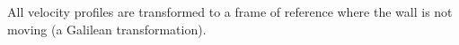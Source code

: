 All velocity profiles are transformed to a frame of reference where the wall is
not moving (a Galilean transformation).
